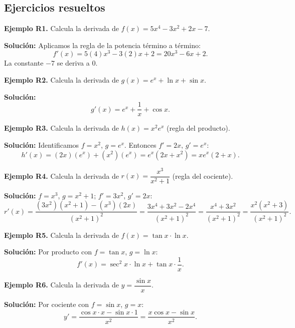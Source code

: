 \documentclass[12pt, a4paper]{article}
\begin{document}
\newpage

\subsection{Ejercicios resueltos}

\textbf{Ejemplo R1.} Calcula la derivada de $f(x) = 5x^4 - 3x^2 + 2x - 7$.

\begin{cuadrosolucion}
  \textbf{Solución:} Aplicamos la regla de la potencia término a término:
  $$f'(x) = 5(4)x^3 - 3(2)x + 2 = 20x^3 - 6x + 2.$$
  La constante $-7$ se deriva a $0$.
\end{cuadrosolucion}

\textbf{Ejemplo R2.} Calcula la derivada de $g(x) = e^x + \ln x + \sin x$.

\begin{cuadrosolucion}
  \textbf{Solución:}
  $$g'(x) = e^x + \frac{1}{x} + \cos x.$$
\end{cuadrosolucion}

\textbf{Ejemplo R3.} Calcula la derivada de $h(x) = x^2 e^x$ (regla del producto).

\begin{cuadrosolucion}
  \textbf{Solución:} Identificamos $f = x^2$, $g = e^x$. Entonces $f' = 2x$, $g' = e^x$:
  $$h'(x) = (2x)(e^x) + (x^2)(e^x) = e^x(2x + x^2) = x e^x (2 + x).$$
\end{cuadrosolucion}

\textbf{Ejemplo R4.} Calcula la derivada de $r(x) = \dfrac{x^3}{x^2 + 1}$ (regla del cociente).

\begin{cuadrosolucion}
  \textbf{Solución:} $f = x^3$, $g = x^2 + 1$; $f' = 3x^2$, $g' = 2x$:
  $$r'(x) = \frac{(3x^2)(x^2 + 1) - (x^3)(2x)}{(x^2 + 1)^2} = \frac{3x^4 + 3x^2 - 2x^4}{(x^2 + 1)^2} = \frac{x^4 + 3x^2}{(x^2 + 1)^2} = \frac{x^2(x^2 + 3)}{(x^2 + 1)^2}.$$
\end{cuadrosolucion}

\textbf{Ejemplo R5.} Calcula la derivada de $f(x) = \tan x \cdot \ln x$.

\begin{cuadrosolucion}
  \textbf{Solución:} Por producto con $f = \tan x$, $g = \ln x$:
  $$f'(x) = \sec^2 x \cdot \ln x + \tan x \cdot \frac{1}{x}.$$
\end{cuadrosolucion}

\textbf{Ejemplo R6.} Calcula la derivada de $y = \dfrac{\sin x}{x}$.

\begin{cuadrosolucion}
  \textbf{Solución:} Por cociente con $f = \sin x$, $g = x$:
  $$y' = \frac{\cos x \cdot x - \sin x \cdot 1}{x^2} = \frac{x \cos x - \sin x}{x^2}.$$
\end{cuadrosolucion}
\end{document}
